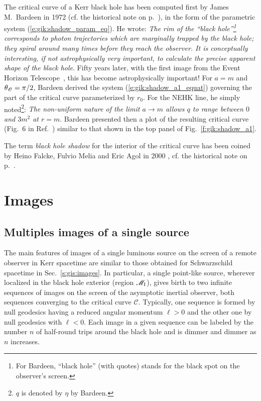 \begin{hist}
The critical curve of a Kerr black hole has been computed
first by James M.~Bardeen in 1972 \cite{Barde73}
(cf. the historical note on p.~\pageref{h:gis:bh_shadow}), in the form
of the parametric system (\ref{e:gik:shadow_param_eq}). He wrote:
\emph{The rim of the ``black hole''\footnote{For Bardeen, ``black hole''
(with quotes) stands for the black spot on the observer's screen.}
corresponds to photon trajectories which
are marginally trapped by the black hole; they spiral around many times before
they reach the observer. It is conceptually interesting, if not astrophysically
very important, to calculate the precise apparent shape of the black hole}.
Fifty years later, with the first image from the Event Horizon Telescope~\cite{EHT19a,Wielg_al20}, this has become astrophysically important!
For $a=m$ and $\theta_{\mathscr{O}}=\pi/2$, Bardeen derived the
system (\ref{e:gik:shadow_a1_equat}) governing the part of the critical
curve parameterized by $r_0$. For the NEHK line, he simply
noted\footnote{$q$ is denoted by $\eta$ by Bardeen.}: \emph{The non-uniform
nature of the limit $a\to m$ allows $q$ to range between
$0$ and $3m^2$ at $r=m$}.
Bardeen presented then
a plot of the resulting critical curve
(Fig.~6 in Ref.~\cite{Barde73})
similar to that
shown in the top panel of Fig.~\ref{f:gik:shadow_a1}.

The term \emph{black hole shadow} for the interior of the critical curve
has been coined by Heino Falcke, Fulvio Melia and Eric Agol in 2000 \cite{FalckMA00}, cf. the historical note on p.~\pageref{h:gik:disk_images}.
\end{hist}



\section{Images} \label{s:gik:images}

\subsection{Multiples images of a single source}

The main features of images of a single luminous source on the screen of a remote observer in Kerr spacetime are similar to those obtained for Schwarzschild spacetime in Sec.~\ref{s:gis:images}.
In particular, a single point-like source, wherever localized in the black hole exterior (region $\mathscr{M}_{\rm I}$),
gives birth to two infinite sequences of images on the screen of the asymptotic inertial observer,
both sequences converging to the critical curve $\mathscr{C}$. Typically, one sequence is formed
by null geodesics having a reduced angular momentum
$\ell>0$ and the other one by null geodesics with $\ell < 0$.
Each image in a given sequence can be labeled by the number $n$ of half-round trips around the black hole and is dimmer and dimmer as $n$ increases.



